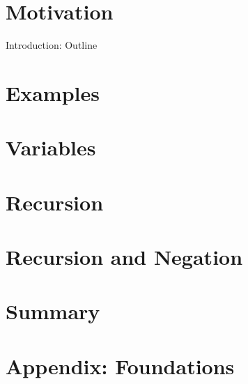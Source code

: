 

\section{Motivation}

\begin{frame}{Introduction: Outline}
  \medskip
  \tableofcontents
\end{frame}
\section{Examples}


\section{Variables}


\section{Recursion}




\section{Recursion and Negation}

\section{Summary}
\section{Appendix: Foundations}

%
